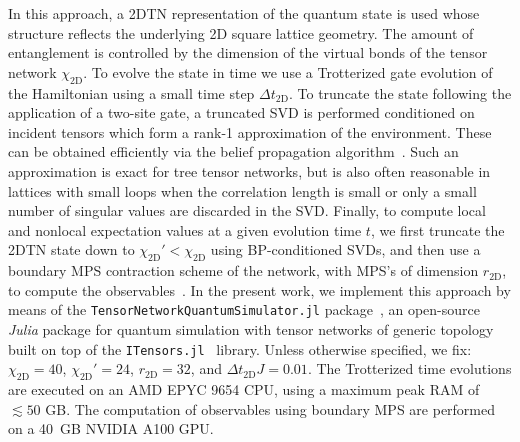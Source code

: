 \documentclass[aps,pra,reprint,amssymb,superscriptaddress]{revtex4-2}
\begin{document}
In this approach, a 2DTN representation of the quantum state is used whose structure reflects the underlying 2D square lattice geometry. The amount of entanglement is controlled by the dimension of the virtual bonds of the tensor network $\chi_{\text{2D}}$. To evolve the state in time we use a Trotterized gate evolution of the Hamiltonian using a small time step $\Delta t_{\text{2D}}$.  To truncate the state following the application of a two-site gate, a truncated SVD is performed conditioned on incident tensors which form a rank-1 approximation of the environment. These can be obtained efficiently via the belief propagation algorithm~\cite{jiang_accurate_2008, alkabetz_tensor_2021, tindall_gauging_2023}. Such an approximation is exact for tree tensor networks, but is also often reasonable in lattices with small loops when the correlation length is small or only a small number of singular values are discarded in the SVD. Finally, to compute local and nonlocal expectation values at a given evolution time $t$, we first truncate the 2DTN state down to $\chi_{\text{2D}}'<\chi_{\text{2D}}$ using BP-conditioned SVDs, and then use a boundary MPS contraction scheme of the network, with MPS's of dimension $r_{\text{2D}}$, to compute the observables~\cite{lubasch_algorithms_2014, verstraete_renormalization_2004}. In the present work, we implement this approach by means of the \texttt{TensorNetworkQuantumSimulator.jl} package~\cite{tindall_tensornetworkquantumsimulatorjl_2025}, an open-source \textit{Julia} package for quantum simulation with tensor networks of generic topology built on top of the \texttt{ITensors.jl}~\cite{fishman_itensor_2022} library. Unless otherwise specified, we fix: $\chi_{\text{2D}}=40$, $\chi_{\text{2D}}'=24$, $r_{\text{2D}}=32$, and $\Delta t_{\text{2D}}J=0.01$. The Trotterized time evolutions are executed on an AMD EPYC 9654 CPU, using a maximum peak RAM of $\lesssim 50$ GB. The computation of observables using boundary MPS are performed on a 40~GB NVIDIA A100 GPU.
\end{document}
